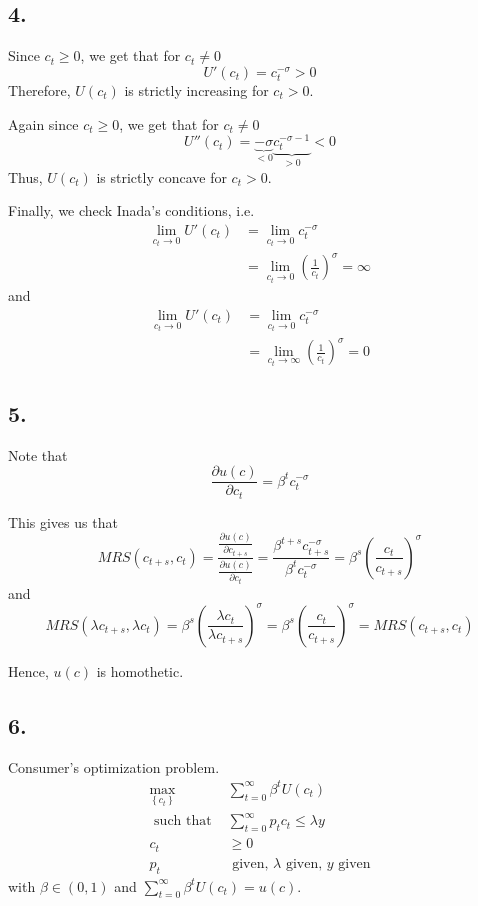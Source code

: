 \documentclass[12pt]{article}
\theoremstyle{definition}
\newcommand\st{\text{ such that }}
\newcommand{\pa}[1]{\left(#1\right)}
\newcommand{\cbra}[1]{\left\{#1\right\}}
\begin{document}
\subsection*{4.}

Since $c_t\geq 0$, we get that for $c_t\neq 0$
\[
U'(c_t) = c_t^{-\sigma} >0
\]
Therefore, $U(c_t)$ is strictly increasing for $c_t> 0$.

Again since $c_t\geq 0$, we get that for $c_t\neq 0$
\[
U''(c_t) = \underbrace{-\sigma }_{<0}\underbrace{ c_t^{-\sigma-1}}_{>0}<0
\]
Thus, $U(c_t)$ is strictly concave for $c_t> 0$.

Finally, we check Inada's conditions, i.e.
\[
\begin{split}
\lim_{c_t\to 0 } U'(c_t) & = \lim_{c_t\to 0 } c_t^{-\sigma}\\
& = \lim_{c_t\to 0 }  \pa{\frac{1}{c_t}}^{\sigma} = \infty
\end{split}
\]
and
\[
\begin{split}
\lim_{c_t\to 0 } U'(c_t) & = \lim_{c_t\to 0 } c_t^{-\sigma}\\
& = \lim_{c_t\to \infty }  \pa{\frac{1}{c_t}}^{\sigma} = 0
\end{split}
\]

\subsection*{5.}
Note that
\[
\frac{\partial u(c)}{\partial c_{t}} = \beta^t c_t^{-\sigma}
\]

This gives us that
\[
MRS(c_{t+s},c_t)=\frac{\frac{\partial u(c)}{\partial c_{t+s}}}{\frac{\partial u(c)}{\partial c_{t}}} = \frac{\beta^{t+s} c_{t+s}^{-\sigma}}{\beta^t c_t^{-\sigma}} =  \beta^s \left(\frac{c_t}{c_{t+s}}\right)^\sigma
\]
and
\[
MRS(\lambda c_{t+s},\lambda c_t)= \beta^s \left(\frac{\lambda c_t}{\lambda c_{t+s}}\right)^\sigma = \beta^s \left(\frac{c_t}{c_{t+s}}\right)^\sigma = MRS(c_{t+s},c_t)
\]

Hence, $u(c)$ is homothetic.

\subsection*{6.}

Consumer's optimization problem.
\[
\begin{split}
\underset{\cbra{c_t}}{\max} &\sum_{t=0}^{\infty}\beta^t U(c_t)\\
\st & \sum_{t=0}^{\infty} p_t c_t \leq \lambda y\\
c_t &\geq 0\\
p_t &\text{ given, } \lambda \text{ given, } y \text{ given}
\end{split}
\]
with $\beta \in (0,1)$ and $\sum_{t=0}^{\infty}\beta^t U(c_t)=u(c)$.
\end{document}
